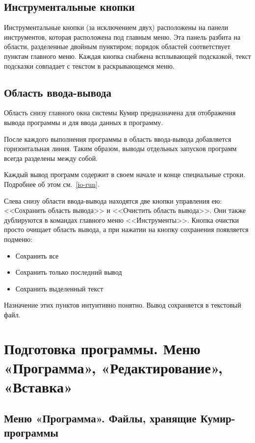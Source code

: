 \subsection{Инструментальные кнопки}

Инструментальные кнопки (за исключением двух) расположены на панели инструментов, которая расположена под главным меню. Эта панель разбита на области, разделенные двойным пунктиром; порядок областей соответствует пунктам главного меню. Каждая кнопка снабжена всплывающей подсказкой, текст подсказки совпадает с текстом в раскрывающемся меню.

\subsection{Область ввода-вывода}
\label{io}

Область снизу главного окна системы Кумир предназначена для отображения вывода программы и для ввода данных в программу.

После каждого выполнения программы в область ввода-вывода добавляется горизонтальная линия. Таким образом, выводы отдельных запусков программ всегда разделены между собой.

Каждый вывод программ содержит в своем начале и конце специальные строки. Подробнее об этом см.~\ref{io-run}.

Слева снизу области ввода-вывода находятся две кнопки управления ею: <<Сохранить область вывода>> и <<Очистить область вывода>>. Они также дублируются в командах главного меню <<Инструменты>>. Кнопка очистки просто очищает область вывода, а при нажатии на кнопку сохранения появляется подменю:
\begin{itemize}
\item Сохранить все
\item Сохранить только последний вывод
\item Сохранить выделенный текст
\end{itemize}
Назначение этих пунктов интуитивно понятно. Вывод сохраняется в текстовый файл.

\section{Подготовка программы. Меню «Программа», «Редактирование», «Вставка»}
\label{preparing}

\subsection{Меню «Программа». Файлы, хранящие Кумир-программы}
\label{menufile}

